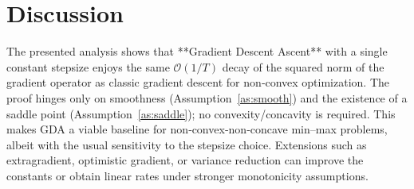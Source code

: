\documentclass{article}
\begin{document}
\section*{Discussion}
The presented analysis shows that **Gradient Descent Ascent** with a single constant stepsize enjoys the same \(\mathcal{O}(1/T)\) decay of the squared norm of the gradient operator as classic gradient descent for non‑convex optimization. The proof hinges only on smoothness (Assumption~\ref{as:smooth}) and the existence of a saddle point (Assumption~\ref{as:saddle}); no convexity/concavity is required. This makes GDA a viable baseline for non‑convex‑non‑concave min–max problems, albeit with the usual sensitivity to the stepsize choice. Extensions such as extragradient, optimistic gradient, or variance reduction can improve the constants or obtain linear rates under stronger monotonicity assumptions.
\end{document}
